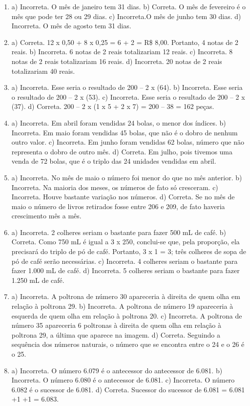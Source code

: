 \begin{enumerate}
\item
a) Incorreta. O mês de janeiro tem 31 dias.
b) Correta. O mês de fevereiro é o mês que pode ter 28 ou 29 dias.
c) Incorreta.O mês de junho tem 30 dias.
d) Incorreta. O mês de agosto tem 31 dias.

\item
a) Correta. 12 x 0,50 + 8 x 0,25 = 6 + 2 = R\$ 8,00. Portanto, 4 notas de 2 reais.
b) Incorreta. 6 notas de 2 reais totalizariam 12 reais.
c) Incorreta. 8 notas de 2 reais totalizariam 16 reais.
d) Incorreta. 20 notas de 2 reais totalizariam 40 reais.

\item
a) Incorreta. Esse seria o resultado de 200 -- 2 x (64).
b) Incorreta. Esse seria o resultado de 200 -- 2 x (53).
c) Incorreta. Esse seria o resultado de 200 -- 2 x (37).
d) Correta. 200 -- 2 x (1 x 5 + 2 x 7) = 200 -- 38 = 162 peças.

\item
a) Incorreta. Em abril foram vendidas 24 bolas, o menor dos índices.
b) Incorreta. Em maio foram vendidas 45 bolas, que não é o dobro de nenhum outro valor.
c) Incorreta. Em junho foram vendidas 62 bolas, número que não representa o dobro de outro mês.
d) Correta. Em julho, pois tivemos uma venda de 72 bolas, que é o triplo das 24 unidades vendidas em abril.

\item
a) Incorreta. No mês de maio o número foi menor do que no mês anterior.
b) Incorreta. Na maioria dos meses, os números de fato só cresceram.
c) Incorreta. Houve bastante variação nos números.
d) Correta. Se no mês de maio o número de livros retirados fosse entre 206 e 209, de fato haveria crescimento mês a mês.

\item
a) Incorreta. 2 colheres seriam o bastante para fazer 500 mL de café.
b) Correta. Como 750 mL é igual a 3 x 250, conclui-se que, pela proporção, ela
precisará do triplo de pó de café. Portanto, 3 x 1 = 3; três colheres de sopa de pó de café serão necessárias.
c) Incorreta. 4 colheres seriam o bastante para fazer 1.000 mL de café.
d) Incorreta. 5 colheres seriam o bastante para fazer 1.250 mL de café.

\item
a) Incorreta. A poltrona de número 30 apareceria à direita de quem olha em relação à poltrona 29.
b) Incorreta. A poltrona de número 19 apareceria à esquerda de quem olha em relação à poltrona 20.
c) Incorreta. A poltrona de número 35 apareceria  6 poltronas à direita de quem olha em relação à poltrona 29, a última que aparece na imagem.
d) Correta. Seguindo a sequência dos números naturais, o número que se encontra entre o 24 e o 26 é o 25.

\item
a) Incorreta. O número 6.079 é o antecessor do antecessor de 6.081.
b) Incorreta. O número 6.080 é o antecessor de 6.081.
c) Incorreta. O número 6.082 é o sucessor de 6.081.
d) Correta. Sucessor do sucessor de 6.081 = 6.081 +1 +1 = 6.083.
\end{enumerate}

